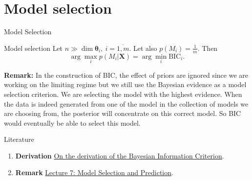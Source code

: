 \documentclass{beamer}
\begin{document}
\section{Model selection}
\begin{frame}{Model Selection}
    \begin{block}{Model selection}
        Let $n \gg \dim\boldsymbol\theta_i, ~i = \overline{1, m}$. Let also $p(M_i) = \frac{1}{m}$.
        Then 
        \[
            \arg\max_i p(M_i|\mathbf{X}) = \arg\min_i \mathrm{BIC}_i.
        \]
    \end{block}

    \textbf{Remark:} In the construction of BIC, the effect of priors are ignored
    since we are working on the limiting regime but we still use the Bayesian evidence
    as a model selection criterion. We are selecting the model with the highest evidence.
    When the data is indeed generated from one of the model in the collection of models we are
    choosing from, the posterior will concentrate on this correct model.
    So BIC would eventually be able to select this model.
\end{frame}


\begin{frame}{Literature}
    \begin{enumerate}
        \item \textbf{Derivation} \href{https://faculty.ucmerced.edu/hbhat/BICderivation.pdf}
        {On the derivation of the Bayesian Information Criterion}.
        \item \textbf{Remark} \href{http://faculty.washington.edu/yenchic/19A_stat535/Lec7_model.pdf}
        {Lecture 7: Model Selection and Prediction}.
    \end{enumerate}
\end{frame}
\end{document}
